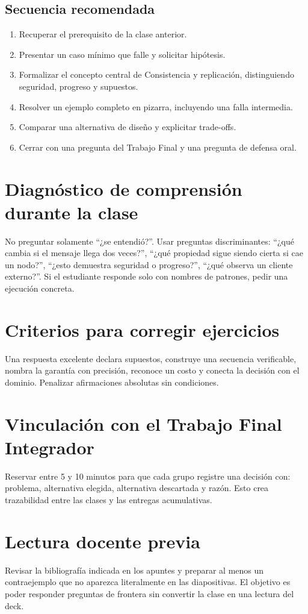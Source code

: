 \documentclass[variant=docente,cover=institutional,mode=screen]{ua-engineering-v6-article}
\begin{document}
\subsection*{Secuencia recomendada}
\begin{enumerate}
\item Recuperar el prerequisito de la clase anterior.
\item Presentar un caso mínimo que falle y solicitar hipótesis.
\item Formalizar el concepto central de Consistencia y replicación, distinguiendo seguridad, progreso y supuestos.
\item Resolver un ejemplo completo en pizarra, incluyendo una falla intermedia.
\item Comparar una alternativa de diseño y explicitar trade-offs.
\item Cerrar con una pregunta del Trabajo Final y una pregunta de defensa oral.
\end{enumerate}
\section{Diagnóstico de comprensión durante la clase}
No preguntar solamente ``¿se entendió?''. Usar preguntas discriminantes: ``¿qué cambia si el mensaje llega dos veces?'', ``¿qué propiedad sigue siendo cierta si cae un nodo?'', ``¿esto demuestra seguridad o progreso?'', ``¿qué observa un cliente externo?''. Si el estudiante responde solo con nombres de patrones, pedir una ejecución concreta.
\section{Criterios para corregir ejercicios}
Una respuesta excelente declara supuestos, construye una secuencia verificable, nombra la garantía con precisión, reconoce un costo y conecta la decisión con el dominio. Penalizar afirmaciones absolutas sin condiciones.
\section{Vinculación con el Trabajo Final Integrador}
Reservar entre 5 y 10 minutos para que cada grupo registre una decisión con: problema, alternativa elegida, alternativa descartada y razón. Esto crea trazabilidad entre las clases y las entregas acumulativas.
\section{Lectura docente previa}
Revisar la bibliografía indicada en los apuntes y preparar al menos un contraejemplo que no aparezca literalmente en las diapositivas. El objetivo es poder responder preguntas de frontera sin convertir la clase en una lectura del deck.
\end{document}

